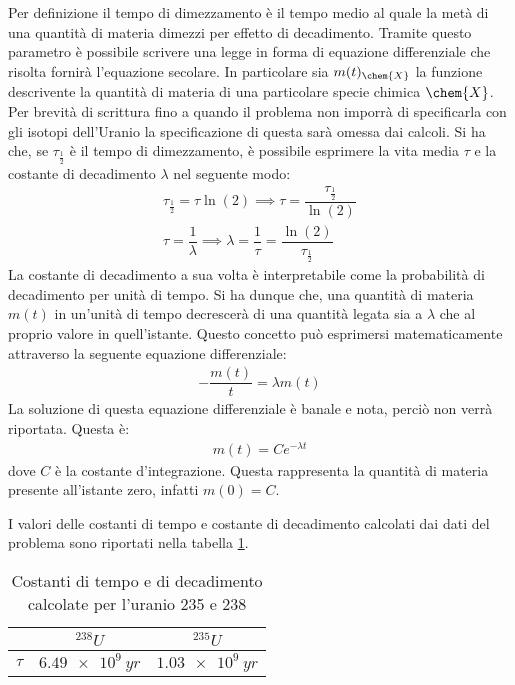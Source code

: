 \documentclass[../main.tex]{subfile}
\begin{document}
\begin{svol}
		Per definizione il tempo di dimezzamento è il tempo medio al quale la metà di una quantità di materia dimezzi per effetto di decadimento. Tramite questo parametro è possibile scrivere una legge in forma di equazione differenziale che risolta fornirà l'equazione secolare. In particolare sia $ m(t)_{\chem{X}} $ la funzione descrivente la quantità di materia di una particolare specie chimica $ \chem{X} $. Per brevità di scrittura fino a quando il problema non imporrà di specificarla con gli isotopi dell'Uranio la specificazione di questa sarà omessa dai calcoli. Si ha che, se $ \tau_{\frac{1}{2}} $ è il tempo di dimezzamento, è possibile esprimere la vita media $ \tau $ e la costante di decadimento $ \lambda $ nel seguente modo:
		\begin{gather}
		\tau_{\frac{1}{2}}=\tau\ln(2) \implies \tau = \dfrac{\tau_{\frac{1}{2}}}{\ln(2)} \\
		\tau = \dfrac{1}{\lambda} \implies \lambda = \dfrac{1}{\tau}=\dfrac{\ln(2)}{\tau_{\frac{1}{2}}}
		\end{gather}
		La costante di decadimento a sua volta è interpretabile come la probabilità di decadimento per unità di tempo. Si ha dunque che, una quantità di materia $ m(t) $ in un'unità di tempo decrescerà di una quantità legata sia a $ \lambda $ che al proprio valore in quell'istante. Questo concetto può esprimersi matematicamente attraverso la seguente equazione differenziale:
		\begin{gather}
			-\dfrac{m(t)}{t}=\lambda m(t)
		\end{gather}
		La soluzione di questa equazione differenziale è banale e nota, perciò non verrà riportata. Questa è:
		\begin{gather}
			m(t)=Ce^{-\lambda t}
		\end{gather}
		dove $ C $ è la costante d'integrazione. Questa rappresenta la quantità di materia presente all'istante zero, infatti $ m(0)=C $.
		
		I valori delle costanti di tempo e costante di decadimento calcolati dai dati del problema sono riportati nella tabella \ref{tbl:decayValues}.
		
		\begin{table}[h]
			\centering
			\caption{Costanti di tempo e di decadimento calcolate per l'uranio 235 e 238}
			\label{tbl:decayValues}
			\vspace{1mm}
		\begin{tabular}{c|cc}
			 
			& $^{238}U$ & $^{235}U$ \\ 
			\hline 
			$\tau$ & $\SI{6.49e9}{yr}$ & $\SI{1.03e9}{yr}$ \\ 
			 

\end{tabular}
\end{table}
\end{svol}
\end{document}
